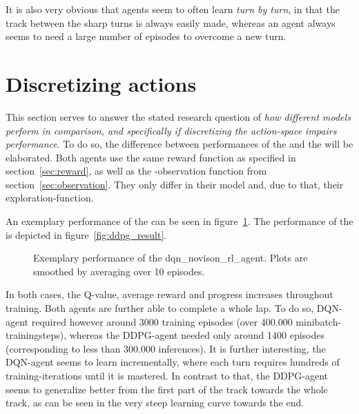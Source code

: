 It is also very obvious that agents seem to often learn \textit{turn by turn}, in that the track between the sharp turns is always easily made, whereas an agent always seems to need a large number of episodes to overcome a new turn.

\section{Discretizing actions}

This section serves to answer the stated research question of \textit{how different models perform in comparison, and specifically if discretizing the action-space impairs performance}. To do so, the difference between performances of the  and the  will be elaborated.
Both agents use the same reward function as specified in section~\ref{sec:reward}, as well as the -observation function from section~\ref{sec:observation}. They only differ in their model and, due to that, their exploration-function.

An exemplary performance of the  can be seen in figure~\ref{fig:dqn_result}. The performance of the  is depicted in figure~\ref{fig:ddpg_result}.

\begin{figure}[h!]
	{%
		\setlength{\fboxsep}{0pt}%
		\setlength{\fboxrule}{1pt}%
	}%
	\centering
	\caption[Exemplary performance of the dqn\_novison\_rl\_agent]{Exemplary performance of the dqn\_novison\_rl\_agent. Plots are smoothed by averaging over 10 episodes.}
	\label{fig:dqn_result}
\end{figure}


In both cases, the Q-value, average reward and progress increases throughout training. Both agents are further able to complete a whole lap. To do so, DQN-agent required however around 3000 training episodes (over 400.000 minibatch-trainingsteps), whereas the DDPG-agent needed only around 1400 episodes (corresponding to less than 300.000 inferences). It is further interesting, the DQN-agent seems to learn incrementally, where each turn requires hundreds of training-iterations until it is mastered. In contrast to that, the DDPG-agent seems to generalize better from the first part of the track towards the whole track, as can be seen in the very steep learning curve towards the end.

